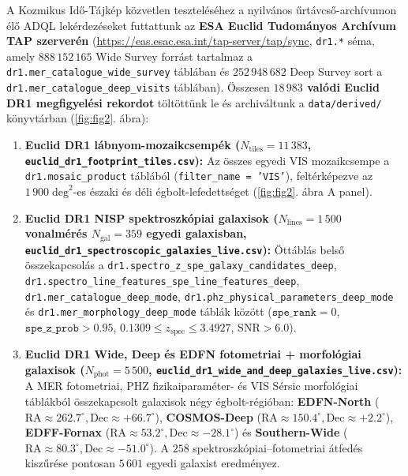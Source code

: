 \documentclass[11pt,a4paper]{article}
\begin{document}
A Kozmikus Idő-Tájkép közvetlen teszteléséhez a nyilvános űrtávcső-archívumon \cite{EuclidOverview2024,EuclidDR1Archive2026} élő ADQL lekérdezéseket futtattunk az \textbf{ESA Euclid Tudományos Archívum TAP szerverén} (\url{https://eas.esac.esa.int/tap-server/tap/sync}, \texttt{dr1.*} séma, amely $888\,152\,165$ Wide Survey forrást tartalmaz a \texttt{dr1.\allowbreak mer\_\allowbreak catalogue\_\allowbreak wide\_\allowbreak survey} táblában és $252\,948\,682$ Deep Survey sort a \texttt{dr1.\allowbreak mer\_\allowbreak catalogue\_\allowbreak deep\_\allowbreak visits} táblában). Összesen \textbf{$18\,983$ valódi Euclid DR1 megfigyelési rekordot} töltöttünk le és archiváltunk a \texttt{data/derived/} könyvtárban (\ref{fig:fig2}. ábra):
\begin{enumerate}
  \item \textbf{Euclid DR1 lábnyom-mozaikcsempék ($N_{\mathrm{tiles}} = 11\,383$, \texttt{euclid\_\allowbreak dr1\_\allowbreak footprint\_\allowbreak tiles.csv}):} Az összes egyedi VIS mozaikcsempe a \texttt{dr1.\allowbreak mosaic\_\allowbreak product} táblából (\texttt{filter\_name = 'VIS'}), feltérképezve az $1\,900\;\mathrm{deg}^2$-es északi és déli égbolt-lefedettséget (\ref{fig:fig2}. ábra A panel).
  \item \textbf{Euclid DR1 NISP spektroszkópiai galaxisok ($N_{\mathrm{lines}} = 1\,500$ vonalmérés $N_{\mathrm{gal}} = 359$ egyedi galaxisban, \texttt{euclid\_\allowbreak dr1\_\allowbreak spectroscopic\_\allowbreak galaxies\_\allowbreak live.csv}):} Öttáblás belső összekapcsolás a \texttt{dr1.\allowbreak spectro\_\allowbreak z\_\allowbreak spe\_\allowbreak galaxy\_\allowbreak candidates\_\allowbreak deep}, \texttt{dr1.\allowbreak spectro\_\allowbreak line\_\allowbreak features\_\allowbreak spe\_\allowbreak line\_\allowbreak features\_\allowbreak deep}, \texttt{dr1.\allowbreak mer\_\allowbreak catalogue\_\allowbreak deep\_\allowbreak mode}, \texttt{dr1.\allowbreak phz\_\allowbreak physical\_\allowbreak parameters\_\allowbreak deep\_\allowbreak mode} és \texttt{dr1.\allowbreak mer\_\allowbreak morphology\_\allowbreak deep\_\allowbreak mode} táblák között ($\texttt{spe\_rank} = 0$, $\texttt{spe\_z\_prob} > 0.95$, $0.1309 \le z_{\mathrm{spec}} \le 3.4927$, $\mathrm{SNR} > 6.0$).
  \item \textbf{Euclid DR1 Wide, Deep és EDFN fotometriai + morfológiai galaxisok ($N_{\mathrm{phot}} = 5\,500$, \texttt{euclid\_\allowbreak dr1\_\allowbreak wide\_\allowbreak and\_\allowbreak deep\_\allowbreak galaxies\_\allowbreak live.csv}):} A MER fotometriai, PHZ fizikaiparaméter- és VIS Sérsic morfológiai táblákból összekapcsolt galaxisok négy égbolt-régióban: \textbf{EDFN-North} ($\mathrm{RA}\approx 262.7^\circ, \mathrm{Dec}\approx +66.7^\circ$), \textbf{COSMOS-Deep} ($\mathrm{RA}\approx 150.4^\circ, \mathrm{Dec}\approx +2.2^\circ$), \textbf{EDFF-Fornax} ($\mathrm{RA}\approx 53.2^\circ, \mathrm{Dec}\approx -28.1^\circ$) és \textbf{Southern-Wide} ($\mathrm{RA}\approx 80.3^\circ, \mathrm{Dec}\approx -51.0^\circ$). A $258$ spektroszkópiai--fotometriai átfedés kiszűrése pontosan $5\,601$ egyedi galaxist eredményez.

\end{enumerate}
\end{document}
